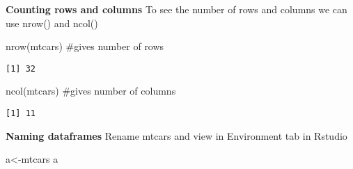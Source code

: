\documentclass[
  letterpaper,
  DIV=11,
  numbers=noendperiod]{scrartcl}
\newenvironment{Shaded}{\begin{snugshade}}{\end{snugshade}}
\newcommand{\CommentTok}[1]{\textcolor[rgb]{0.37,0.37,0.37}{#1}}
\newcommand{\FunctionTok}[1]{\textcolor[rgb]{0.28,0.35,0.67}{#1}}
\newcommand{\NormalTok}[1]{\textcolor[rgb]{0.00,0.23,0.31}{#1}}
\newcommand{\OtherTok}[1]{\textcolor[rgb]{0.00,0.23,0.31}{#1}}
\begin{document}
\textbf{Counting rows and columns} To see the number of rows and columns
we can use nrow() and ncol()

\begin{Shaded}
\begin{Highlighting}[]
\FunctionTok{nrow}\NormalTok{(mtcars) }\CommentTok{\#gives number of rows}
\end{Highlighting}
\end{Shaded}

\begin{verbatim}
[1] 32
\end{verbatim}

\begin{Shaded}
\begin{Highlighting}[]
\FunctionTok{ncol}\NormalTok{(mtcars) }\CommentTok{\#gives number of columns}
\end{Highlighting}
\end{Shaded}

\begin{verbatim}
[1] 11
\end{verbatim}

\textbf{Naming dataframes} Rename mtcars and view in Environment tab in
Rstudio

\begin{Shaded}
\begin{Highlighting}[]
\NormalTok{a}\OtherTok{\textless{}{-}}\NormalTok{mtcars}
\NormalTok{a}
\end{Highlighting}
\end{Shaded}
\end{document}
